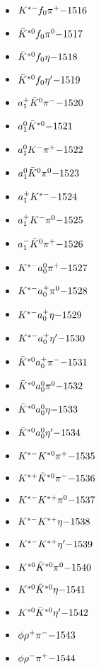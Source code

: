 \begin{multicols}{3}
\begin{itemize}
 \item $ K^{*-} f_{0} \pi^{+} \hfill{-1516}$
 \item $ \bar{K}^{*0} f_{0} \pi^{0} \hfill{-1517}$
 \item $ \bar{K}^{*0} f_{0} \eta \hfill{-1518}$
 \item $ \bar{K}^{*0} f_{0} {\eta^{\prime}} \hfill{-1519}$
 \item $ a_{1}^{+} \bar{K}^{0} \pi^{-} \hfill{-1520}$
 \item $ a_{1}^{0} \bar{K}^{*0} \hfill{-1521}$
 \item $ a_{1}^{0} K^{-} \pi^{+} \hfill{-1522}$
 \item $ a_{1}^{0} \bar{K}^{0} \pi^{0} \hfill{-1523}$
 \item $ a_{1}^{+} K^{*-} \hfill{-1524}$
 \item $ a_{1}^{+} K^{-} \pi^{0} \hfill{-1525}$
 \item $ a_{1}^{-} \bar{K}^{0} \pi^{+} \hfill{-1526}$
 \item $ K^{*-} a_{0}^{0} \pi^{+} \hfill{-1527}$
 \item $ K^{*-} a_{0}^{+} \pi^{0} \hfill{-1528}$
 \item $ K^{*-} a_{0}^{+} \eta \hfill{-1529}$
 \item $ K^{*-} a_{0}^{+} {\eta^{\prime}} \hfill{-1530}$
 \item $ \bar{K}^{*0} a_{0}^{+} \pi^{-} \hfill{-1531}$
 \item $ \bar{K}^{*0} a_{0}^{0} \pi^{0} \hfill{-1532}$
 \item $ \bar{K}^{*0} a_{0}^{0} \eta \hfill{-1533}$
 \item $ \bar{K}^{*0} a_{0}^{0} {\eta^{\prime}} \hfill{-1534}$
 \item $ K^{*-} K^{*0} \pi^{+} \hfill{-1535}$
 \item $ K^{*+} \bar{K}^{*0} \pi^{-} \hfill{-1536}$
 \item $ K^{*-} K^{*+} \pi^{0} \hfill{-1537}$
 \item $ K^{*-} K^{*+} \eta \hfill{-1538}$
 \item $ K^{*-} K^{*+} {\eta^{\prime}} \hfill{-1539}$
 \item $ K^{*0} \bar{K}^{*0} \pi^{0} \hfill{-1540}$
 \item $ K^{*0} \bar{K}^{*0} \eta \hfill{-1541}$
 \item $ K^{*0} \bar{K}^{*0} {\eta^{\prime}} \hfill{-1542}$
 \item $ \phi \rho^{+} \pi^{-} \hfill{-1543}$
 \item $ \phi \rho^{-} \pi^{+} \hfill{-1544}$

\end{itemize}
\end{multicols}
